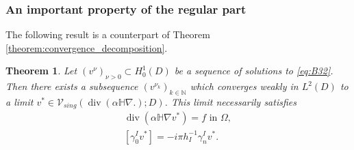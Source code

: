 \documentclass[report]{elsarticle}
\newtheorem{theorem}{Theorem}[section]
\numberwithin{theorem}{section}
\begin{document}
\subsubsection{An important property of the regular part}
The following result is a counterpart of Theorem \ref{theorem:convergence_decomposition}. 
\begin{theorem}
	\label{theorem:convergence_decomposition_general}
	Let $(v^{\nu})_{\nu>0}\subset {H}^1_0(D)$ be a sequence of solutions to \eqref{eq:B32}. Then there exists a subsequence $(v^{\nu_k})_{k\in\mathbb{N}}$ which converges weakly in $L^2(D)$ to a limit ${v}^*\in \mathcal{V}_{sing}(\operatorname{div}(\alpha\mathbb{H}\nabla.);D)$. This limit necessarily satisfies 
	\begin{align*}
		\operatorname{div}(\alpha\mathbb{H}\nabla {v}^*)= f\text{ in }\Omega,\\
		[\gamma_0^{I}{v}^*]=-i\pi h_I^{-1}\gamma_n^{I}{v}^*.
	\end{align*}
\end{theorem}
\end{document}
